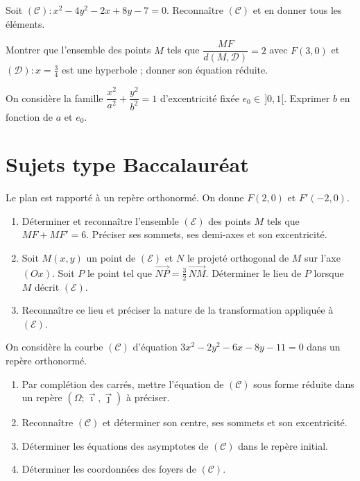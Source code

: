 \exo{} Soit $(\mathcal C):x^{2}-4y^{2}-2x+8y-7=0$. Reconnaître $(\mathcal C)$ et en
donner tous les éléments.

\exo{} Montrer que l'ensemble des points $M$ tels que $\dfrac{MF}{d(M,\mathcal D)}=2$
avec $F(3,0)$ et $(\mathcal D):x=\tfrac34$ est une hyperbole ; donner son équation réduite.

\exo{} On considère la famille $\dfrac{x^{2}}{a^{2}}+\dfrac{y^{2}}{b^{2}}=1$
d'excentricité fixée $e_0\in\,]0,1[$. Exprimer $b$ en fonction de $a$ et $e_0$.

\section{Sujets type Baccalauréat}

Le plan est rapporté à un repère orthonormé. On donne $F(2,0)$ et $F'(-2,0)$.
\begin{enumerate}[label=\arabic*)]
\item Déterminer et reconnaître l'ensemble $(\mathcal E)$ des points $M$ tels que
$MF+MF'=6$. Préciser ses sommets, ses demi-axes et son excentricité.
\item Soit $M(x,y)$ un point de $(\mathcal E)$ et $N$ le projeté orthogonal de $M$ sur
l'axe $(Ox)$. Soit $P$ le point tel que $\overrightarrow{NP}=\tfrac32\,\overrightarrow{NM}$.
Déterminer le lieu de $P$ lorsque $M$ décrit $(\mathcal E)$.
\item Reconnaître ce lieu et préciser la nature de la transformation appliquée à $(\mathcal E)$.
\end{enumerate}

On considère la courbe $(\mathcal C)$ d'équation
$3x^{2}-2y^{2}-6x-8y-11=0$ dans un repère orthonormé.
\begin{enumerate}[label=\arabic*)]
\item Par complétion des carrés, mettre l'équation de $(\mathcal C)$ sous forme réduite
dans un repère $(\Omega;\vec\imath,\vec\jmath)$ à préciser.
\item Reconnaître $(\mathcal C)$ et déterminer son centre, ses sommets et son excentricité.
\item Déterminer les équations des asymptotes de $(\mathcal C)$ dans le repère initial.
\item Déterminer les coordonnées des foyers de $(\mathcal C)$.
\end{enumerate}

